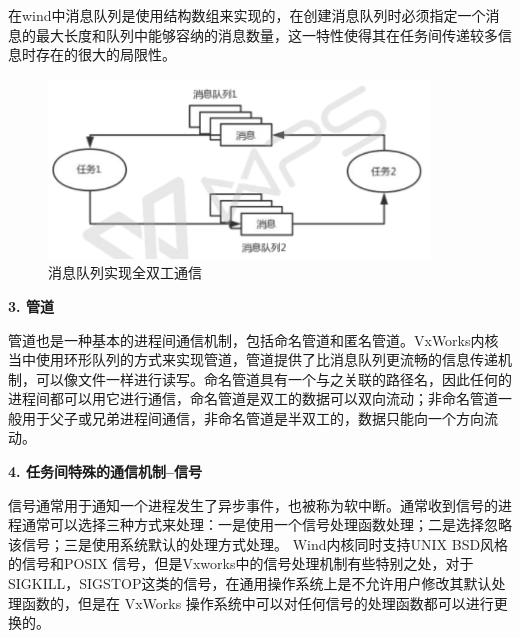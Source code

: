 	在wind中消息队列是使用结构数组来实现的，在创建消息队列时必须指定一个消息的最大长度和队列中能够容纳的消息数量，这一特性使得其在任务间传递较多信息时存在的很大的局限性\cite{冯云贺2014基于}。
	
\begin{figure}[!h]
\centering
\includegraphics[width=0.9\textwidth]{./graphics/messageQueue.pdf}
\caption{消息队列实现全双工通信}\label{fig:消息队列}
\end{figure}	
					
	\noindent \textbf{3. 管道}
	
	管道也是一种基本的进程间通信机制，包括命名管道和匿名管道。VxWorks内核当中使用环形队列的方式来实现管道，管道提供了比消息队列更流畅的信息传递机制，可以像文件一样进行读写。命名管道具有一个与之关联的路径名，因此任何的进程间都可以用它进行通信，命名管道是双工的数据可以双向流动；非命名管道一般用于父子或兄弟进程间通信，非命名管道是半双工的，数据只能向一个方向流动。
	
\noindent \textbf{4. 任务间特殊的通信机制--信号} 

	信号通常用于通知一个进程发生了异步事件，也被称为软中断。通常收到信号的进程通常可以选择三种方式来处理：一是使用一个信号处理函数处理；二是选择忽略该信号；三是使用系统默认的处理方式处理。
Wind内核同时支持UNIX BSD风格的信号和POSIX 信号，但是Vxworks中的信号处理机制有些特别之处，对于SIGKILL，SIGSTOP这类的信号，在通用操作系统上是不允许用户修改其默认处理函数的，但是在 VxWorks 操作系统中可以对任何信号的处理函数都可以进行更换的。






























